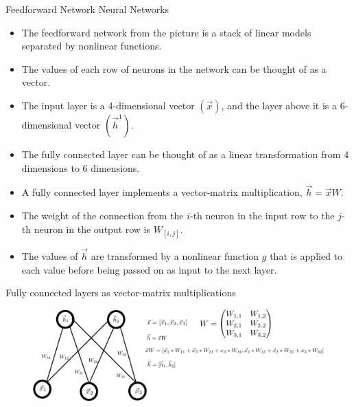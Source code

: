 \documentclass[handout]{beamer}
\begin{document}
\begin{frame}{Feedforward Network Neural Networks}
\begin{scriptsize}
\begin{itemize}
\item The feedforward network from the picture is a stack of linear models separated by nonlinear functions.
\item The values of each row of neurons in the network can be thought of as a vector. 

\item The input layer is a 4-dimensional vector $(\vec{x})$, and the layer above it is a 6-dimensional vector $(\vec{h}^1)$.
\item The fully connected layer can be thought of as a linear transformation from 4 dimensions to 6 dimensions. 
\item A fully connected layer implements a vector-matrix multiplication, $\vec{h}=\vec{x}W$.
\item The weight of the connection from the $i$-th neuron in the input row to the $j$-th neuron in the output row is $W_{[i,j]}$.
\item The values of $\vec{h}$ are transformed by a nonlinear function $g$ that is applied to each value before being passed on as input to the next layer.

\end{itemize}


\end{scriptsize}
\end{frame}



\begin{frame}{Fully connected layers as vector-matrix multiplications}
\begin{figure}[htb]
	\centering
	 \includegraphics[scale=0.65]{pics/neural_net_mat_mul.pdf}
\end{figure}
\end{frame}
\end{document}
